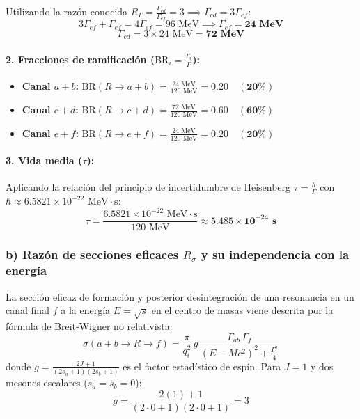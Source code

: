\begin{problema}
Utilizando la razón conocida $R_\Gamma = \frac{\Gamma_{cd}}{\Gamma_{ef}} = 3 \implies \Gamma_{cd} = 3 \Gamma_{ef}$:
\begin{equation*}
3 \Gamma_{ef} + \Gamma_{ef} = 4 \Gamma_{ef} = 96\text{ MeV} \implies \Gamma_{ef} = \mathbf{24\text{ MeV}}
\end{equation*}
\begin{equation*}
\Gamma_{cd} = 3 \times 24\text{ MeV} = \mathbf{72\text{ MeV}}
\end{equation*}

\paragraph{2. Fracciones de ramificación ($\text{BR}_i = \frac{\Gamma_i}{\Gamma}$):}
\begin{itemize}
    \item \textbf{Canal $a+b$:} $\text{BR}(R \to a+b) = \frac{24\text{ MeV}}{120\text{ MeV}} = \mathbf{0.20 \quad (20\%)}$
    \item \textbf{Canal $c+d$:} $\text{BR}(R \to c+d) = \frac{72\text{ MeV}}{120\text{ MeV}} = \mathbf{0.60 \quad (60\%)}$
    \item \textbf{Canal $e+f$:} $\text{BR}(R \to e+f) = \frac{24\text{ MeV}}{120\text{ MeV}} = \mathbf{0.20 \quad (20\%)}$
\end{itemize}

\paragraph{3. Vida media ($\tau$):}
Aplicando la relación del principio de incertidumbre de Heisenberg $\tau = \frac{\hbar}{\Gamma}$ con $\hbar \approx 6.5821 \times 10^{-22}\text{ MeV}\cdot\text{s}$:
\begin{equation*}
\tau = \frac{6.5821 \times 10^{-22}\text{ MeV}\cdot\text{s}}{120\text{ MeV}} \approx \mathbf{5.485 \times 10^{-24}\text{ s}}
\end{equation*}

\subsubsection*{b) Razón de secciones eficaces $R_\sigma$ y su independencia con la energía}

La sección eficaz de formación y posterior desintegración de una resonancia en un canal final $f$ a la energía $E = \sqrt{s}$ en el centro de masas viene descrita por la fórmula de Breit-Wigner no relativista:
\begin{equation*}
\sigma(a+b \to R \to f) = \frac{\pi}{q_i^2} \, g \, \frac{\Gamma_{ab} \, \Gamma_f}{(E - M c^2)^2 + \frac{\Gamma^2}{4}}
\end{equation*}
donde $g = \frac{2J + 1}{(2s_a + 1)(2s_b + 1)}$ es el factor estadístico de espín. Para $J = 1$ y dos mesones escalares ($s_a = s_b = 0$):
\begin{equation*}
g = \frac{2(1) + 1}{(2\cdot 0 + 1)(2\cdot 0 + 1)} = 3
\end{equation*}


\end{problema}
